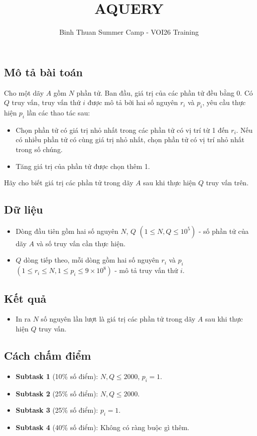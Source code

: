 \documentclass[12pt]{article}
\begin{document}
\title{AQUERY}
\author{Binh Thuan Summer Camp - VOI26 Training}
\maketitle

\setlength{\parindent}{0pt}
\setlength{\parskip}{1em}

\subsection*{Mô tả bài toán}
Cho một dãy $A$ gồm $N$ phần tử. Ban đầu, giá trị của các phần tử đều bằng 0. Có $Q$ truy vấn, 
truy vấn thứ $i$ được mô tả bởi hai số nguyên $r_i$ và $p_i$, yêu cầu thực hiện $p_i$ lần các thao tác sau:
\begin{itemize}
  \item Chọn phần tử có giá trị nhỏ nhất trong các phần tử có vị trí từ 1 đến $r_i$. 
        Nếu có nhiều phần tử có cùng giá trị nhỏ nhất, chọn phần tử có vị trí nhỏ nhất trong số chúng.
  \item Tăng giá trị của phần tử được chọn thêm 1.
\end{itemize}
Hãy cho biết giá trị các phần tử trong dãy $A$ sau khi thực hiện $Q$ truy vấn trên.

\subsection*{Dữ liệu}
\begin{itemize}
  \item Dòng đầu tiên gồm hai số nguyên $N$, $Q$ $(1 \leq N, Q \leq 10^5)$ - số phần tử của dãy $A$ và số truy vấn cần thực hiện.
  \item $Q$ dòng tiếp theo, mỗi dòng gồm hai số nguyên $r_i$ và $p_i$ $(1 \leq r_i \leq N, 1 \leq p_i \leq 9 \times 10^8)$ - mô tả truy vấn thứ $i$.
\end{itemize}

\subsection*{Kết quả}
\begin{itemize}
  \item In ra $N$ số nguyên lần lượt là giá trị các phần tử trong dãy $A$ sau khi thực hiện $Q$ truy vấn.
\end{itemize}

\subsection*{Cách chấm điểm}
\begin{itemize}
  \item \textbf{Subtask 1} (10\% số điểm): $N, Q \leq 2000$, $p_i = 1$.
  \item \textbf{Subtask 2} (25\% số điểm): $N, Q \leq 2000$.
  \item \textbf{Subtask 3} (25\% số điểm): $p_i = 1$.
  \item \textbf{Subtask 4} (40\% số điểm): Không có ràng buộc gì thêm.
\end{itemize}
\end{document}
